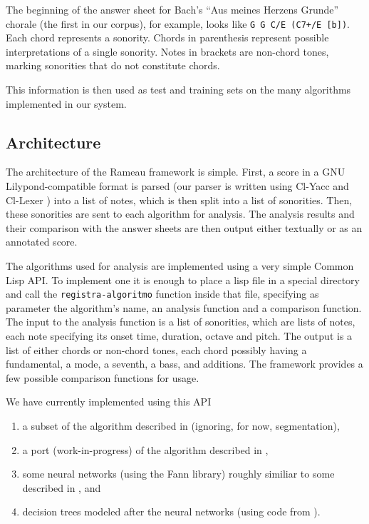 \documentclass{article}
\begin{document}
The beginning of the answer sheet for Bach's ``Aus meines Herzens
Grunde'' chorale (the first in our corpus), for example, looks like
\texttt{G G C/E (C7+/E [b])}. Each chord represents a sonority. Chords
in parenthesis represent possible interpretations of a single
sonority. Notes in brackets are non-chord tones, marking sonorities
that do not constitute chords.

This information is then used as test and training sets on the many
algorithms implemented in our system.

\subsection{Architecture}
\label{sec:architecture-and-api}

The architecture of the Rameau framework is simple. First, a score in
a GNU Lilypond-compatible format is parsed (our parser is written
using Cl-Yacc \cite{chroboczek:_cl_yacc_manual} and Cl-Lexer
\cite{parker:_lexer_packag}) into a list of notes, which is then split
into a list of sonorities. Then, these sonorities are sent to each
algorithm for analysis. The analysis results and their comparison with
the answer sheets are then output either textually or as an annotated
score.

The algorithms used for analysis are implemented using a very simple
Common Lisp API. To implement one it is enough to place a lisp file in
a special directory and call the \texttt{registra-algoritmo} function
inside that file, specifying as parameter the algorithm's name, an
analysis function and a comparison function. The input to the analysis
function is a list of sonorities, which are lists of notes, each note
specifying its onset time, duration, octave and pitch. The output is a
list of either chords or non-chord tones, each chord possibly having a
fundamental, a mode, a seventh, a bass, and additions. The framework
provides a few possible comparison functions for usage.

We have currently implemented using this API 
\begin{enumerate}
\item a subset of the algorithm described in \cite{pardo02:algorithms}
  (ignoring, for now, segmentation), 
\item a port (work-in-progress) of the algorithm described in
  \cite{temperley99:modeling}, 
\item some neural networks (using the Fann \cite{nissen:fann}
  library) roughly similiar to some described in
  \cite{tsui02:_harmon_analy_using_neural_networ}, and
\item decision trees modeled after the neural networks (using code
  from \cite{Mitchell:1997:ML}).
\end{enumerate}
\end{document}
